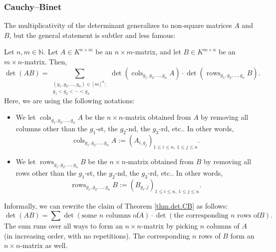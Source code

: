 \subsubsection{Cauchy--Binet}

The multiplicativity of the determinant generalizes to non-square matrices $A$
and $B$, but the general statement is subtler and less famous:

\begin{theorem}
\label{thm.det.CB}Let $n,m\in\mathbb{N}$. Let $A\in
K^{n\times m}$ be an $n\times m$-matrix, and let $B\in K^{m\times n}$ be an
$m\times n$-matrix. Then,%
\[
\det\left(  AB\right)  =\sum_{\substack{\left(  g_{1},g_{2},\ldots
,g_{n}\right)  \in\left[  m\right]  ^{n};\\g_{1}<g_{2}<\cdots<g_{n}}%
}\det\left(  \operatorname*{cols}\nolimits_{g_{1},g_{2},\ldots,g_{n}}A\right)
\cdot\det\left(  \operatorname*{rows}\nolimits_{g_{1},g_{2},\ldots,g_{n}%
}B\right)  .
\]
Here, we are using the following notations:

\begin{itemize}
\item We let $\operatorname*{cols}\nolimits_{g_{1},g_{2},\ldots,g_{n}}A$ be
the $n\times n$-matrix obtained from $A$ by removing all columns other than
the $g_{1}$-st, the $g_{2}$-nd, the $g_{3}$-rd, etc.. In other words,%
\[
\operatorname*{cols}\nolimits_{g_{1},g_{2},\ldots,g_{n}}A:=\left(  A_{i,g_{j}%
}\right)  _{1\leq i\leq n,\ 1\leq j\leq n}.
\]


\item We let $\operatorname*{rows}\nolimits_{g_{1},g_{2},\ldots,g_{n}}B$ be
the $n\times n$-matrix obtained from $B$ by removing all rows other than the
$g_{1}$-st, the $g_{2}$-nd, the $g_{3}$-rd, etc.. In other words,%
\[
\operatorname*{rows}\nolimits_{g_{1},g_{2},\ldots,g_{n}}B:=\left(  B_{g_{i}%
,j}\right)  _{1\leq i\leq n,\ 1\leq j\leq n}.
\]

\end{itemize}
\end{theorem}

Informally, we can rewrite the claim of Theorem \ref{thm.det.CB} as follows:%
\[
\det\left(  AB\right)  =\sum\det\left(  \text{some }n\text{ columns of
}A\right)  \cdot\det\left(  \text{the corresponding }n\text{ rows of
}B\right)  .
\]
The sum runs over all ways to form an $n\times n$-matrix by picking $n$
columns of $A$ (in increasing order, with no repetitions). The corresponding
$n$ rows of $B$ form an $n\times n$-matrix as well.

